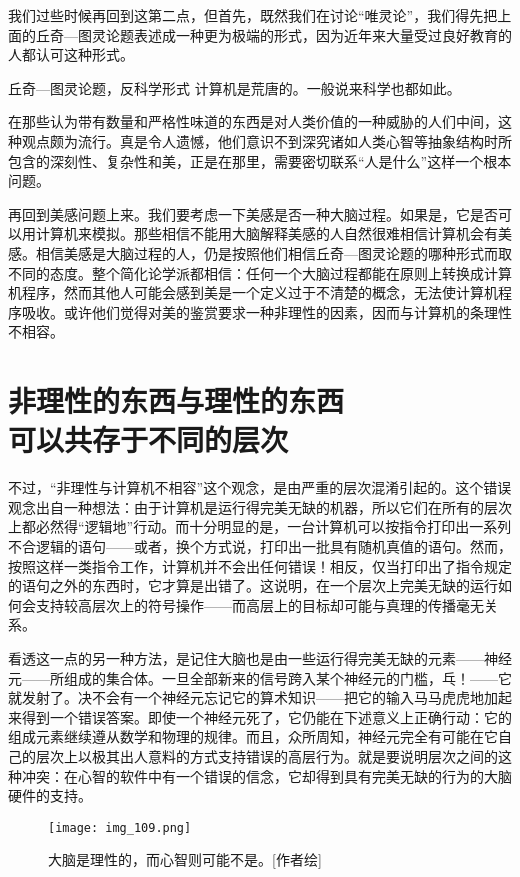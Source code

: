 我们过些时候再回到这第二点，但首先，既然我们在讨论“唯灵论”，我们得先把上面的丘奇—图灵论题表述成一种更为极端的形式，因为近年来大量受过良好教育的人都认可这种形式。

\begin{thm}[2\ccwd]{丘奇—图灵论题，反科学形式}
计算机是荒唐的。一般说来科学也都如此。
\end{thm}

在那些认为带有数量和严格性味道的东西是对人类价值的一种威胁的人们中间，这种观点颇为流行。真是令人遗憾，他们意识不到深究诸如人类心智等抽象结构时所包含的深刻性、复杂性和美，正是在那里，需要密切联系“人是什么”这样一个根本问题。

再回到美感问题上来。我们要考虑一下美感是否一种大脑过程。如果是，它是否可以用计算机来模拟。那些相信不能用大脑解释美感的人自然很难相信计算机会有美感。相信美感是大脑过程的人，仍是按照他们相信丘奇—图灵论题的哪种形式而取不同的态度。整个简化论学派都相信：任何一个大脑过程都能在原则上转换成计算机程序，然而其他人可能会感到美是一个定义过于不清楚的概念，无法使计算机程序吸收。或许他们觉得对美的鉴赏要求一种非理性的因素，因而与计算机的条理性不相容。

\section{非理性的东西与理性的东西\\可以共存于不同的层次}

不过，“非理性与计算机不相容”这个观念，是由严重的层次混淆引起的。这个错误观念出自一种想法：由于计算机是运行得完美无缺的机器，所以它们在所有的层次上都必然得“逻辑地”行动。而十分明显的是，一台计算机可以按指令打印出一系列不合逻辑的语句——或者，换个方式说，打印出一批具有随机真值的语句。然而，按照这样一类指令工作，计算机并不会出任何错误！相反，仅当打印出了指令规定的语句之外的东西时，它才算是出错了。这说明，在一个层次上完美无缺的运行如何会支持较高层次上的符号操作——而高层上的目标却可能与真理的传播毫无关系。

看透这一点的另一种方法，是记住大脑也是由一些运行得完美无缺的元素——神经元——所组成的集合体。一旦全部新来的信号跨入某个神经元的门槛，乓！——它就发射了。决不会有一个神经元忘记它的算术知识——把它的输入马马虎虎地加起来得到一个错误答案。即使一个神经元死了，它仍能在下述意义上正确行动：它的组成元素继续遵从数学和物理的规律。而且，众所周知，神经元完全有可能在它自己的层次上以极其出人意料的方式支持错误的高层行为。就是要说明层次之间的这种冲突：在心智的软件中有一个错误的信念，它却得到具有完美无缺的行为的大脑硬件的支持。

\begin{figure}
\texttt{[image: img\_109.png]}
\caption[大脑的低层与高层之间的冲突。]
  {大脑是理性的，而心智则可能不是。[作者绘]}
\end{figure}

